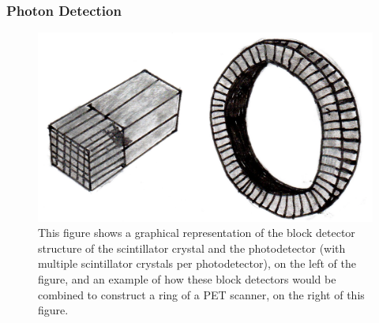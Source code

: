             \subsubsection{Photon Detection} \label{sec:photon_detection}
                \begin{figure}
                    \centering
                    
                    \includegraphics[width=1.0\linewidth]{figures/background_detector.png}
                    
                    \captionsetup{singlelinecheck=false, justification=raggedright}
                    \caption{This figure shows a graphical representation of the block detector structure of the scintillator crystal and the photodetector (with multiple scintillator crystals per photodetector), on the left of the figure, and an example of how these block detectors would be combined to construct a ring of a \gls{PET} scanner, on the right of this figure.} \label{fig:photon_detection_detector}
                \end{figure}
                
